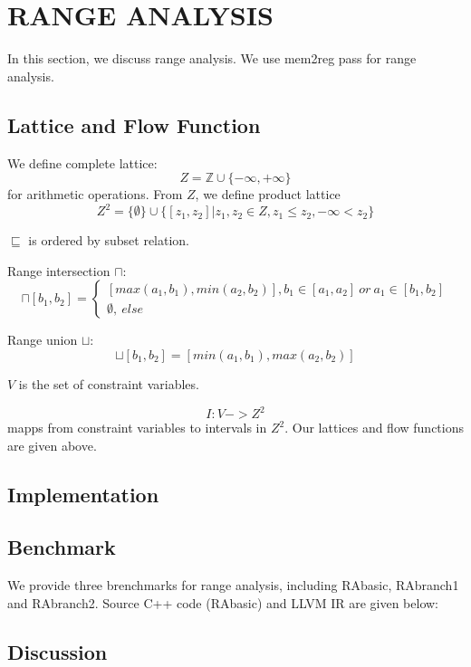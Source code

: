 \section{RANGE ANALYSIS}
In this section, we discuss range analysis. We use mem2reg pass for range analysis.

\subsection{Lattice and Flow Function}
We define complete lattice:
\begin{equation}
Z = \mathbb{Z} \cup \{-\infty, +\infty\}
\end{equation}
for arithmetic operations. 
From $Z$, we define product lattice
\begin{equation}
Z^2 = \{\emptyset \} \cup \{[z_1, z_2] | z_1, z_2 \in Z, z_1 \le z_2, -\infty < z_2 \}
\end{equation}

$\sqsubseteq$ is ordered by subset relation. 

Range intersection $\sqcap$:
\begin{equation}
[a_1, a_2] \sqcap [b_1, b_2] =
\begin{cases}
[max(a_1, b_1), min(a_2, b_2)], b_1 \in [a_1, a_2] \ or \  a_1 \in [b_1, b_2] \\
\emptyset , \ else
\end{cases}
\end{equation}

Range union $\sqcup$:
\begin{equation}
[a_1, a_2] \sqcup [b_1, b_2] = [min(a_1, b_1), max(a_2, b_2)]
\end{equation}

$V$ is the set of constraint variables.

\begin{equation}
I: V -> Z^2
\end{equation}
mapps from constraint variables to intervals in $Z^2$. Our lattices and flow functions are given above.

\subsection{Implementation}

\subsection{Benchmark}
We provide three brenchmarks for range analysis, including RAbasic, RAbranch1 and RAbranch2. Source C++ code (RAbasic) and LLVM IR are given below:





\subsection{Discussion}
